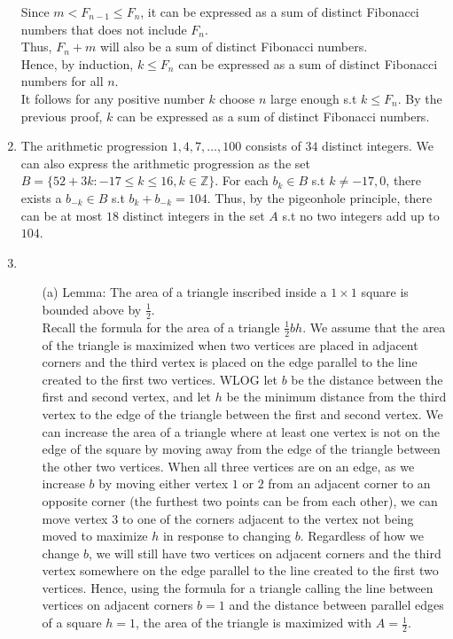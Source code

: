 \documentclass[10pt]{article}
\begin{document}
\begin{enumerate}[label= (Q-\arabic*)]
    Since $m< F_{n-1}\le F_n$, it can be expressed as a sum of distinct Fibonacci numbers that does not include $F_n$. \\
    Thus, $F_n+m$ will also be a sum of distinct Fibonacci numbers.\\
    Hence, by induction, $k\le F_n$ can be expressed as a sum of distinct Fibonacci numbers for all $n$.\\
    It follows for any positive number $k$ choose $n$ large enough s.t $k\le F_n$. 
    By the previous proof, $k$ can be expressed as a sum of distinct Fibonacci numbers.
    \item The arithmetic progression $1,4,7,\ldots,100$ consists of $34$ distinct integers. 
    We can also express the arithmetic progression as the set $B=\{52+3k:-17\le k\le 16,k\in\mathbb{Z}\}$. 
    For each $b_k\in B$ s.t $k\neq-17,0$, there exists a $b_{-k}\in B$ s.t $b_k+b_{-k}=104$.
    Thus, by the pigeonhole principle, there can be at most $18$ distinct integers in the set $A$ s.t no two integers add up to $104$.
    \item \begin{itemize}
        \item [(a)]Lemma: The area of a triangle inscribed inside a $1\times1$ square is bounded above by $\frac{1}{2}$.\\
        Recall the formula for the area of a triangle $\frac{1}{2}bh$.
        We assume that the area of the triangle is maximized when two vertices are placed in adjacent corners and the third vertex is placed on the edge parallel to the line created to the first two vertices.
        WLOG let $b$ be the distance between the first and second vertex, and let $h$ be the minimum distance from the third vertex to the edge of the triangle between the first and second vertex.
        We can increase the area of a triangle where at least one vertex is not on the edge of the square by moving away from the edge of the triangle between the other two vertices.
        When all three vertices are on an edge, as we increase $b$ by moving either vertex $1$ or $2$ from an adjacent corner to an opposite corner (the furthest two points can be from each other), we can move vertex $3$ to one of the corners adjacent to the vertex not being moved to maximize $h$ in response to changing $b$.
        Regardless of how we change $b$, we will still have two vertices on adjacent corners and the third vertex somewhere on the edge parallel to the line created to the first two vertices. 
        Hence, using the formula for a triangle calling the line between vertices on adjacent corners $b=1$ and the distance between parallel edges of a square $h=1$, the area of the triangle is maximized with $A=\frac{1}{2}$.\\
    

\end{itemize}
\end{enumerate}
\end{document}
